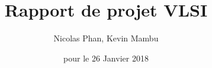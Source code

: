 \documentclass{article}
\begin{document}
\title{Rapport de projet VLSI}
\author{Nicolas Phan, Kevin Mambu}
\date{pour le 26 Janvier 2018}
\pagestyle{headings}
\maketitle
\end{document}
